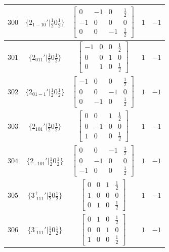 \documentclass[fleqn,8pt]{jsarticle}
\begin{document}
\begin{longtable}{ccccc}
$ 300 $ & $ \{2{}_{1-10}{}'|\frac{1}{2} 0 \frac{1}{2}\} $ & $ \begin{bmatrix} 0 & -1 & 0 & \frac{1}{2} \\ -1 & 0 & 0 & 0 \\ 0 & 0 & -1 & \frac{1}{2} \end{bmatrix} $ & $ 1 $ & $ -1 $ \\ \hline
$ 301 $ & $ \{2{}_{011}{}'|\frac{1}{2} 0 \frac{1}{2}\} $ & $ \begin{bmatrix} -1 & 0 & 0 & \frac{1}{2} \\ 0 & 0 & 1 & 0 \\ 0 & 1 & 0 & \frac{1}{2} \end{bmatrix} $ & $ 1 $ & $ -1 $ \\ \hline
$ 302 $ & $ \{2{}_{01-1}{}'|\frac{1}{2} 0 \frac{1}{2}\} $ & $ \begin{bmatrix} -1 & 0 & 0 & \frac{1}{2} \\ 0 & 0 & -1 & 0 \\ 0 & -1 & 0 & \frac{1}{2} \end{bmatrix} $ & $ 1 $ & $ -1 $ \\ \hline
$ 303 $ & $ \{2{}_{101}{}'|\frac{1}{2} 0 \frac{1}{2}\} $ & $ \begin{bmatrix} 0 & 0 & 1 & \frac{1}{2} \\ 0 & -1 & 0 & 0 \\ 1 & 0 & 0 & \frac{1}{2} \end{bmatrix} $ & $ 1 $ & $ -1 $ \\ \hline
$ 304 $ & $ \{2{}_{-101}{}'|\frac{1}{2} 0 \frac{1}{2}\} $ & $ \begin{bmatrix} 0 & 0 & -1 & \frac{1}{2} \\ 0 & -1 & 0 & 0 \\ -1 & 0 & 0 & \frac{1}{2} \end{bmatrix} $ & $ 1 $ & $ -1 $ \\ \hline
$ 305 $ & $ \{3^{+}_{\,\,111}{}'|\frac{1}{2} 0 \frac{1}{2}\} $ & $ \begin{bmatrix} 0 & 0 & 1 & \frac{1}{2} \\ 1 & 0 & 0 & 0 \\ 0 & 1 & 0 & \frac{1}{2} \end{bmatrix} $ & $ 1 $ & $ -1 $ \\ \hline
$ 306 $ & $ \{3^{-}_{\,\,111}{}'|\frac{1}{2} 0 \frac{1}{2}\} $ & $ \begin{bmatrix} 0 & 1 & 0 & \frac{1}{2} \\ 0 & 0 & 1 & 0 \\ 1 & 0 & 0 & \frac{1}{2} \end{bmatrix} $ & $ 1 $ & $ -1 $ \\ \hline

\end{longtable}
\end{document}
